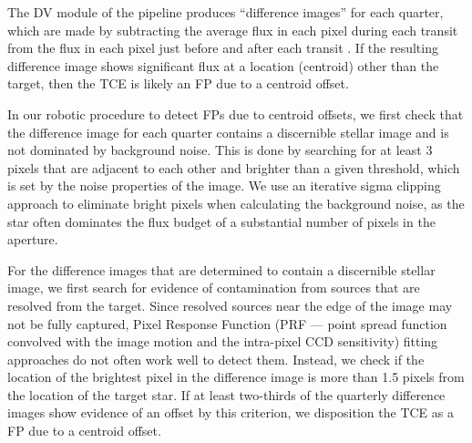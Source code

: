 

The DV module of the \kepler{} pipeline produces ``difference images'' for each quarter, which are made by subtracting the average flux in each pixel during each transit from the flux in each pixel just before and after each transit \citep{Bryson2013}. If the resulting difference image shows significant flux at a location (centroid) other than the target, then the TCE is likely an FP due to a centroid offset.



In our robotic procedure to detect FPs due to centroid offsets, we first check that the difference image for each quarter contains a discernible stellar image and is not dominated by background noise. This is done by searching for at least 3 pixels that are adjacent to each other and brighter than a given threshold, which is set by the noise properties of the image. We use an iterative sigma clipping approach to eliminate bright pixels when calculating the background noise, as the star often dominates the flux budget of a substantial number of pixels in the aperture.

For the difference images that are determined to contain a discernible stellar image, we first search for evidence of contamination from sources that are resolved from the target. Since resolved sources near the edge of the image may not be fully captured, Pixel Response Function (PRF --- \keplers{} point spread function convolved with the image motion and the intra-pixel CCD sensitivity) fitting approaches do not often work well to detect them. Instead, we check if the location of the brightest pixel in the difference image is more than 1.5 pixels from the location of the target star. If at least two-thirds of the quarterly difference images show evidence of an offset by this criterion, we disposition the TCE as a FP due to a centroid offset. %

